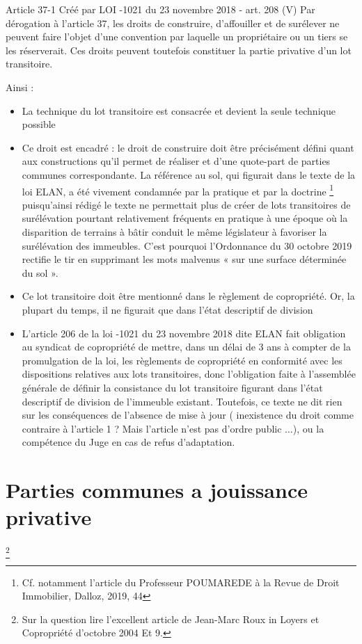 			Article 37-1 Créé par LOI -1021 du 23 novembre 2018 - art. 208 (V)
			Par dérogation à l'article 37, les droits de construire, d'affouiller et de surélever ne peuvent faire l'objet
			d'une convention par laquelle un propriétaire ou un tiers se les réserverait. Ces droits peuvent toutefois
			constituer la partie privative d'un lot transitoire.
			
			Ainsi :
			\begin{itemize}
				\item La technique du lot transitoire est consacrée et devient la seule technique possible
				\item  Ce droit est encadré : le droit de construire doit être précisément défini quant aux constructions
				qu'il permet de réaliser et d'une quote-part de parties communes correspondante. La référence au
				sol, qui figurait dans le texte de la loi ELAN, a été vivement condamnée par la pratique et par la
				doctrine \footnote{Cf. notamment l’article du Professeur POUMAREDE à la Revue de Droit Immobilier, Dalloz, 2019, 44} puisqu’ainsi rédigé le texte ne permettait plus de créer de lots transitoires de
				surélévation pourtant relativement fréquents en pratique à une époque où la disparition de terrains
				à bâtir conduit le même législateur à favoriser la surélévation des immeubles. C’est pourquoi
				l’Ordonnance du 30 octobre 2019 rectifie le tir en supprimant les mots malvenus « sur une surface
				déterminée du sol ».
				\item  Ce lot transitoire doit être mentionné dans le règlement de copropriété. Or, la plupart du temps, il
				ne figurait que dans l’état descriptif de division
				\item  L’article 206 \II de la loi -1021 du 23 novembre 2018 dite ELAN fait obligation au syndicat de
				copropriété de mettre, dans un délai de 3 ans à compter de la promulgation de la loi, les règlements
				de copropriété en conformité avec les dispositions relatives aux lots transitoires, donc l’obligation
				faite à l’assemblée générale de définir la consistance du lot transitoire figurant dans l’état descriptif
				de division de l’immeuble existant. Toutefois, ce texte ne dit rien sur les conséquences de l’absence
				de mise à jour ( inexistence du droit comme contraire à l’article 1 ? Mais l’article n’est pas d’ordre
				public $\dots$), ou la compétence du Juge en cas de refus d’adaptation.
			\end{itemize}

\section{Parties communes a jouissance privative}\footnote{Sur la question lire l’excellent article de Jean-Marc Roux in Loyers et Copropriété d’octobre 2004 Et 9.}


